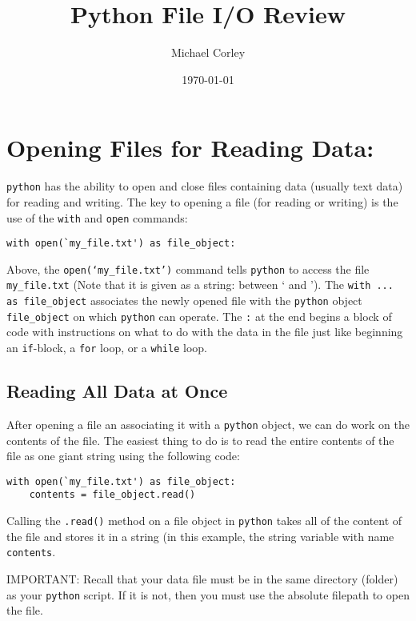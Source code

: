 \documentclass[11pt]{article}
\author{Michael Corley}
\date{\today}
\title{Python File I/O Review}
\begin{document}
\maketitle
\tableofcontents


\section{Opening Files for Reading Data:}
\label{sec:org4d82707}
\texttt{python} has the ability to open and close files containing data (usually text data) for
reading and writing. The key to opening a file (for reading or writing) is the use of the
\texttt{with} and \texttt{open} commands:

\begin{verbatim}
with open(`my_file.txt') as file_object:
\end{verbatim}

Above, the \texttt{open(`my\_file.txt')} command tells \texttt{python} to access the file \texttt{my\_file.txt}
(Note that it is given as a string: between ` and '). The \texttt{with ... as file\_object} associates
the newly opened file with the \texttt{python} object \texttt{file\_object} on which \texttt{python} can operate.
The \texttt{:} at the end begins a block of code with instructions on what to do with the data in the
file just like beginning an \texttt{if}-block, a \texttt{for} loop, or a \texttt{while} loop.

\subsection{Reading All Data at Once}
\label{sec:org9f83ab5}
After opening a file an associating it with a \texttt{python} object, we can do work on the contents
of the file. The easiest thing to do is to read the entire contents of the file as one
giant string using the following code:

\begin{verbatim}
with open(`my_file.txt') as file_object:
    contents = file_object.read()
\end{verbatim}

Calling the \texttt{.read()} method on a file object in \texttt{python} takes all of the content of the file
and stores it in a string (in this example, the string variable with name \texttt{contents}.

IMPORTANT: Recall that your data file must be in the same directory (folder) as your \texttt{python}
script. If it is not, then you must use the absolute filepath to open the file.
\end{document}
